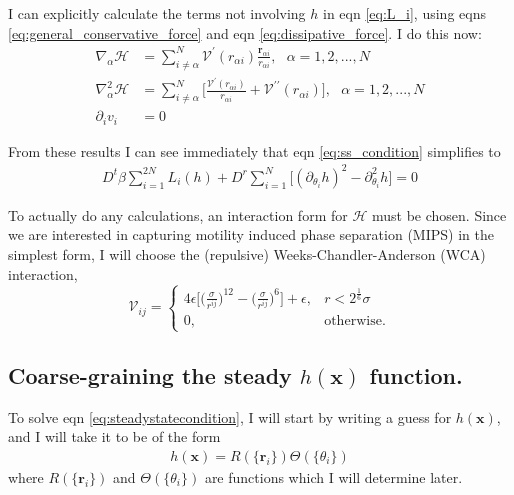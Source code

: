 \documentclass{article}
\begin{document}
I can explicitly calculate the terms not involving $h$ in eqn \ref{eq:L_i}, using eqns
\ref{eq:general_conservative_force} and eqn \ref{eq:dissipative_force}. I do this now:
\begin{subequations}
  \label{eqs:partials_of_L_i}
  \begin{align}
    \nabla_{\alpha}\mathcal{H}
    &=\sum_{i\neq\alpha}^N\mathcal{V}^{\prime}
      (r_{\alpha i})\frac{\bm{r}_{\alpha i}}{r_{\alpha i}},
      \:\:\:\alpha=1,2,...,N\label{eq:partial_H_of_L_i}\\
    \nabla_{\alpha}^2\mathcal{H}
    &=\sum_{i\neq\alpha}^N\bigg[\frac{\mathcal{V}^{\prime}(r_{\alpha i})}{r_{\alpha i}}
      +\mathcal{V}^{\prime\prime}(r_{\alpha i})\bigg],
      \:\:\:\alpha=1,2,...,N\label{eq:partialsq_H_of_L_i}\\
    \partial_i v_i
    &= 0\label{eq:partial_v_of_L_i}
  \end{align}
\end{subequations}

From these results I can see immediately that eqn \ref{eq:ss_condition} simplifies to
\begin{align}\label{eq:steadystatecondition}
  D^t\beta\sum_{i=1}^{2N}L_i(h)+D^r\sum_{i=1}^{N}\big[(\partial_{\theta_i}h)^2
  -\partial_{\theta_i}^2h\big]=0
\end{align}

To actually do any calculations, an interaction form for $\mathcal{H}$ must be chosen. Since we
are interested in capturing motility induced phase separation (MIPS) in the simplest form, I
will choose the (repulsive) Weeks-Chandler-Anderson (WCA) interaction,
\begin{equation}\label{eq:WCAapprox}
  \mathcal{V}_{ij} =
  \begin{cases}
    4\epsilon\bigg[\bigg(\frac{\sigma}{r^{ij}}\bigg)^{12}
    -\bigg(\frac{\sigma}{r^{ij}}\bigg)^6\bigg]+\epsilon, & r<2^{\frac{1}{6}}\sigma \\
    0, & \mathrm{otherwise}.
  \end{cases}
\end{equation}


\subsection{Coarse-graining the steady $h(\bm{x})$ function.}

To solve eqn \ref{eq:steadystatecondition}, I will start by writing a guess for $h(\bm{x})$, and I
will take it to be of the form
\begin{align}\label{eq:hgeneric}
  h(\bm{x})=R(\{\bm{r}_i\})\Theta(\{\theta_i\})
\end{align}
where $R(\{\bm{r}_i\})$ and $\Theta(\{\theta_i\})$ are functions which I will determine later.
\end{document}
